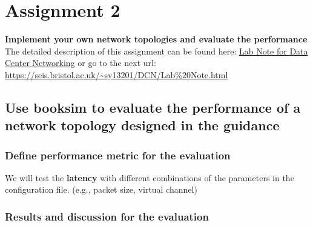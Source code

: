 

\chapter{Assignment 2} \label{chap-3}
\textbf{Implement your own network topologies and evaluate the performance}\\
The detailed description of this assignment can be found here: \href{https://seis.bristol.ac.uk/~sy13201/DCN/Lab\%20Note.html}{Lab Note for Data Center Networking} or go to the next url: \url{https://seis.bristol.ac.uk/~sy13201/DCN/Lab\%20Note.html}


\section{Use booksim to evaluate the performance of a network topology designed in the guidance}



\subsection{Define performance metric for the evaluation}
\label{sec:3.1.1}
We will test the \textbf{latency} with different combinations of the parameters in the configuration file. (e.g., packet size, virtual channel)
    
\subsection{Results and discussion for the evaluation}


